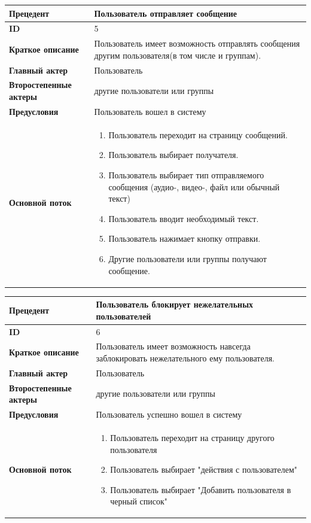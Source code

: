 \begin{center}
  \begin{tabular}{|l|p{9cm}|}
  \hline
  \textbf{Прецедент} & Пользователь отправляет сообщение\\
  \hline
  \textbf{ID} & 5 \\
  \hline
  \textbf{Краткое описание} & Пользователь имеет возможность отправлять сообщения другим пользователя(в том числе и группам). \\
  \hline
  \textbf{Главный актер} & Пользователь\\
  \hline
  \textbf{Второстепенные актеры} & другие пользователи или группы \\
  \hline
  \textbf{Предусловия} & Пользователь вошел в систему \\
  \hline
  \textbf{Основной поток} & \begin{enumerate}
    \item Пользователь переходит на страницу сообщений.
    \item Пользователь выбирает получателя.
    \item Пользователь выбирает тип отправляемого сообщения (аудио-, видео-, файл или обычный текст)
    \item Пользователь вводит необходимый текст.
    \item Пользователь нажимает кнопку отправки. 
    \item Другие пользователи или группы получают сообщение.
  \end{enumerate} \\
  \hline
\end{tabular}
\end{center}

\begin{center}
  \begin{tabular}{|l|p{9cm}|}
  \hline
  \textbf{Прецедент} & Пользователь блокирует нежелательных пользователей\\
  \hline
  \textbf{ID} & 6 \\
  \hline
  \textbf{Краткое описание} & Пользователь имеет возможность навсегда заблокировать нежелательного ему пользователя. \\
  \hline
  \textbf{Главный актер} & Пользователь\\
  \hline
  \textbf{Второстепенные актеры} & другие пользователи или группы \\
  \hline
  \textbf{Предусловия} & Пользователь успешно вошел в систему \\
  \hline
  \textbf{Основной поток} & \begin{enumerate}
    \item Пользователь переходит на страницу другого пользователя
    \item Пользователь выбирает "действия с пользователем"
    \item Пользователь выбирает "Добавить пользователя в черный список" 
  \end{enumerate} \\
  \hline
\end{tabular}
\end{center}

